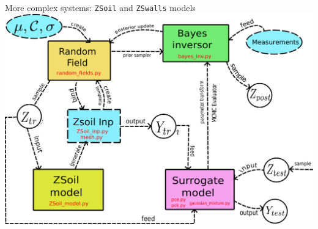 \documentclass[dvipsnames]{beamer}
\begin{document}
	\begin{frame}{More complex systems: \texttt{ZSoil} and \texttt{ZSwalls} models}
	\includegraphics[width=\textwidth]{workflow.pdf}
	\end{frame}
	
\end{document}
